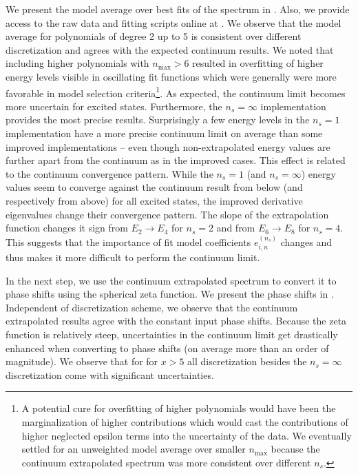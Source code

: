 We present the model average over best fits of the spectrum in .
Also, we provide access to the raw data and fitting scripts online at \cite{luescher-nd_201}.
We observe that the model average for polynomials of degree 2 up to 5 is consistent over different discretization and agrees with the expected continuum results.
We noted that including higher polynomials with $n_\mathrm{max} > 6$ resulted in overfitting of higher energy levels visible in oscillating fit functions which were generally were more favorable in model selection criteria\footnote{
    A potential cure for overfitting of higher polynomials would have been the marginalization of higher contributions which would cast the contributions of higher neglected epsilon terms into the uncertainty of the data.
    We eventually settled for an unweighted model average over smaller $n_\mathrm{max}$ because the continuum extrapolated spectrum was more consistent over different $n_s$.
}.
As expected, the continuum limit becomes more uncertain for excited states.
Furthermore, the $n_s = \infty$ implementation provides the most precise results.
Surprisingly a few energy levels in the $n_s = 1$ implementation have a more precise continuum limit on average than some improved implementations -- even though non-extrapolated energy values are further apart from the continuum as in the improved cases.
This effect is related to the continuum convergence pattern.
While the $n_s = 1$ (and $n_s = \infty$) energy values seem to converge against the continuum result from below (and respectively from above) for all excited states, the improved derivative eigenvalues change their convergence pattern.
The slope of the extrapolation function changes it sign from $E_2 \to E_4$ for $n_s = 2$ and from $E_6 \to E_8$ for  $n_s = 4$.
This suggests that the importance of fit model coefficients $e_{i,n}^{(n_s)}$ changes and thus makes it more difficult to perform the continuum limit.

In the next step, we use the continuum extrapolated spectrum to convert it to phase shifts using the spherical zeta function.
We present the phase shifts in .
Independent of discretization scheme, we observe that the continuum extrapolated results agree with the constant input phase shifts.
Because the zeta function is relatively steep, uncertainties in the continuum limit get drastically enhanced when converting to phase shifts (on average more than an order of magnitude).
We observe that for for $x > 5$ all discretization besides the $n_s = \infty$ discretization come with significant uncertainties.



